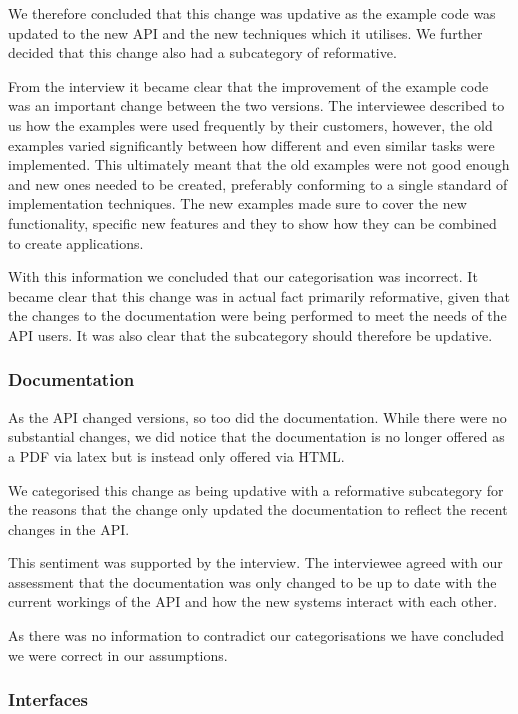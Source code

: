 \documentclass{sig-alternate}
\begin{document}
We therefore concluded that this change was updative as the example code was updated to the new API and the new techniques which it utilises. We further decided that this change also had a subcategory of reformative.

From the interview it became clear that the improvement of the example code was an important change between the two versions. The interviewee described to us how the examples were used frequently by their customers, however, the old examples varied significantly between how different and even similar tasks were implemented. This ultimately meant that the old examples were not good enough and new ones needed to be created, preferably conforming to a single standard of implementation techniques. The new examples made sure to cover the new functionality, specific new features and they to show how they can be combined to create applications.

With this information we concluded that our categorisation was incorrect. It became clear that this change was in actual fact primarily reformative, given that the changes to the documentation were being performed to meet the needs of the API users. It was also clear that the subcategory should therefore be updative. 

\subsubsection{Documentation}

As the API changed versions, so too did the documentation. While there were no substantial changes, we did notice that the documentation is no longer offered as a PDF via latex but is instead only offered via HTML. 

We categorised this change as being updative with a reformative subcategory for the reasons that the change only updated the documentation to reflect the recent changes in the API.

This sentiment was supported by the interview. The interviewee agreed with our assessment that the documentation was only changed to be up to date with the current workings of the API and how the new systems interact with each other.

As there was no information to contradict our categorisations we have concluded we were correct in our assumptions.

\subsubsection{Interfaces}
\end{document}
